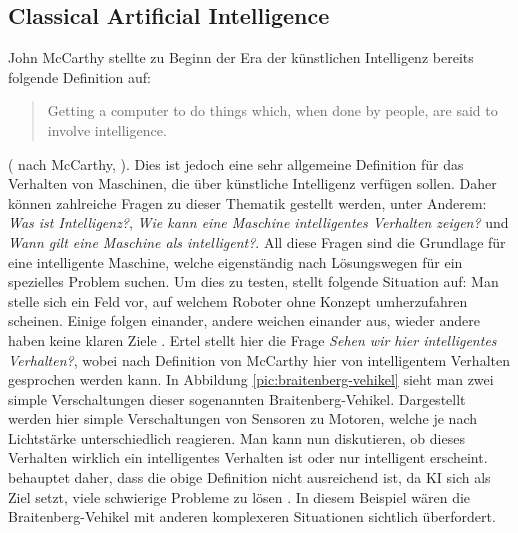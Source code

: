         \subsection{Classical Artificial Intelligence}\label{subsec:cai}
            John McCarthy stellte zu Beginn der Era der künstlichen Intelligenz bereits folgende Definition
            auf:
            \begin{quote}
                Getting a computer to do things which, when done by people, are said to involve intelligence.
            \end{quote}
            (\citeauthor{ertel2016grundkurs} nach McCarthy, \citeyear{ertel2016grundkurs}). Dies ist jedoch eine sehr
            allgemeine Definition für das Verhalten von Maschinen, die über künstliche Intelligenz verfügen sollen.
            Daher können zahlreiche Fragen zu dieser Thematik gestellt werden, unter Anderem: \textit{Was ist Intelligenz?},
            \textit{Wie kann eine Maschine intelligentes Verhalten zeigen?} und \textit{Wann gilt eine Maschine als intelligent?}.
            All diese Fragen sind die Grundlage für eine intelligente Maschine, welche eigenständig nach Lösungswegen
            für ein spezielles Problem suchen. Um dies zu testen, stellt \citeauthor{ertel2016grundkurs} folgende Situation
            auf: Man stelle sich ein Feld vor, auf welchem Roboter ohne Konzept umherzufahren scheinen. Einige folgen einander,
            andere weichen einander aus, wieder andere haben keine klaren Ziele \cite[s. 2]{ertel2016grundkurs}.
            Ertel stellt hier die Frage \textit{Sehen wir hier intelligentes Verhalten?}, wobei nach Definition von
            McCarthy hier von intelligentem Verhalten gesprochen werden kann. In Abbildung \ref{pic:braitenberg-vehikel}
            sieht man zwei simple Verschaltungen dieser sogenannten Braitenberg-Vehikel. Dargestellt werden hier simple
            Verschaltungen von Sensoren zu Motoren, welche je nach Lichtstärke unterschiedlich reagieren.
            Man kann nun diskutieren, ob dieses Verhalten wirklich ein intelligentes Verhalten ist oder
            nur intelligent erscheint. \citeauthor{ertel2016grundkurs} behauptet daher, dass die obige Definition nicht
            ausreichend ist, da KI sich als Ziel setzt, viele schwierige Probleme zu lösen \citeyearpar{ertel2016grundkurs}.
            In diesem Beispiel wären die Braitenberg-Vehikel mit anderen komplexeren Situationen sichtlich überfordert.

